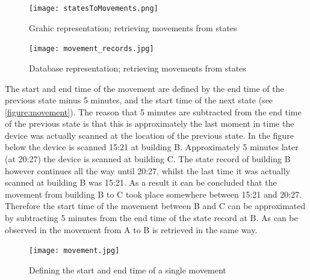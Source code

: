 \begin{figure}[H]
\centering
\texttt{[image: statesToMovements.png]}
\captionsetup{justification=centering}
\caption{Grahic representation; retrieving movements from states}
\label{figure:statesToMovements}
\end{figure}

\begin{figure}[H]
\centering
\texttt{[image: movement\_records.jpg]}
\captionsetup{justification=centering}
\caption{Database representation; retrieving movements from states}
\label{figure:movementrecs}
\end{figure}

The start and end time of the movement are defined by the end time of the previous state minus 5 minutes, and the start time of the next state (see \autoref{figure:movement}). The reason that 5 minutes are subtracted from the end time of the previous state is that this is approximately the last moment in time the device was actually scanned at the location of the previous state. In the figure below the device is scanned 15:21 at building B. Approximately 5 minutes later (at 20:27) the device is scanned at building C. The state record of building B however continues all the way until 20:27, whilst the last time it was actually scanned at building B was 15:21. As a result it can be concluded that the movement from building B to C took place somewhere between 15:21 and 20:27. Therefore the start time of the movement between B and C can be approximated by subtracting 5 minutes from the end time of the state record at B. As can be observed in the movement from A to B is retrieved in the same way.

\begin{figure}[H]
\centering
\texttt{[image: movement.jpg]}
\captionsetup{justification=centering}
\caption{Defining the start and end time of a single movement}
\label{figure:movement}
\end{figure}


